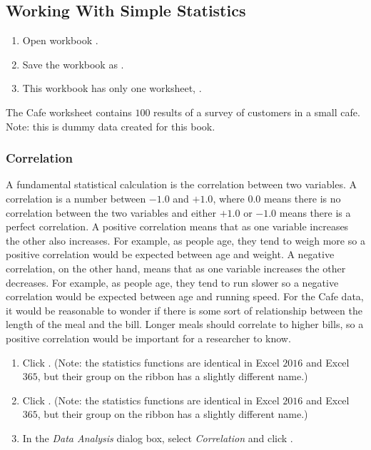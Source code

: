 \subsection{Working With Simple Statistics}

\begin{enumerate}[resume]
	\item Open workbook .
	\item Save the workbook as .
	\item This workbook has only one worksheet, .
\end{enumerate}

The Cafe worksheet contains $ 100 $ results of a survey of customers in a small cafe. Note: this is dummy data created for this book.

\subsubsection{Correlation}

A fundamental statistical calculation is the correlation between two variables. A correlation is a number between $ -1.0 $ and $ +1.0 $, where $ 0.0 $ means there is no correlation between the two variables and either $ +1.0 $ or $ -1.0 $ means there is a perfect correlation. A positive correlation means that as one variable increases the other also increases. For example, as people age, they tend to weigh more so a positive correlation would be expected between age and weight. A negative correlation, on the other hand, means that as one variable increases the other decreases. For example, as people age, they tend to run slower so a negative correlation would be expected between age and running speed. For the Cafe data, it would be reasonable to wonder if there is some sort of relationship between the length of the meal and the bill. Longer meals should correlate to higher bills, so a positive correlation would be important for a researcher to know.

\begin{enumerate}[resume]
	\item {} Click . (Note: the statistics functions are identical in Excel $ 2016 $ and Excel $ 365 $, but their group on the ribbon has a slightly different name.)
	\item {} Click . (Note: the statistics functions are identical in Excel $ 2016 $ and Excel $ 365 $, but their group on the ribbon has a slightly different name.)
	\item In the \textit{Data Analysis} dialog box, select \textit{Correlation} and click .
\end{enumerate}

